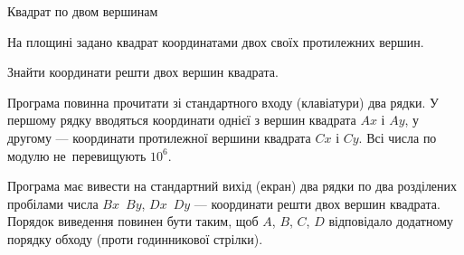 ﻿\begin{problemAllDefault}{Квадрат по двом вершинам}

На площині задано квадрат координатами двох своїх протилежних вершин.

Знайти координати решти двох вершин квадрата. 

\InputFile Програма повинна прочитати зі стандартного входу (клавіатури) два рядки. У першому рядку вводяться координати однієї з вершин квадрата $Ax$ і $Ay$, у другому --- координати протилежної вершини квадрата $Cx$ і $Cy$. Всі числа по модулю не~перевищують $10^{6}$.

\OutputFile Програма має вивести на стандартний вихід (екран) два рядки по два розділених пробілами числа $Bx$~$By$, $Dx$~$Dy$ --- координати решти двох вершин квадрата. Порядок виведення повинен бути таким, щоб $A$, $B$, $C$, $D$ відповідало додатному порядку обходу (проти годинникової стрілки).


\Example

\begin{example}
\end{example}

\end{problemAllDefault}

